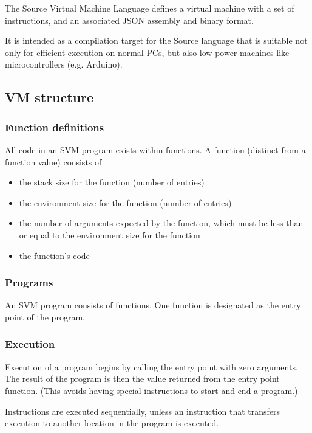 The Source Virtual Machine Language defines a virtual machine with a set of instructions,
and an associated JSON assembly and binary format.

It is intended as a compilation target for the Source language that is suitable
not only for efficient execution on normal PCs, but also low-power machines like
microcontrollers (e.g. Arduino).

\subsection{VM structure}

\subsubsection{Function definitions}

All code in an SVM program exists within functions. A function (distinct
from a function value) consists of

\begin{itemize}
\item
  the stack size for the function (number of entries)
\item
  the environment size for the function (number of entries)
\item
  the number of arguments expected by the function, which must be less
  than or equal to the environment size for the function
\item
  the function's code
\end{itemize}

\subsubsection{Programs}

An SVM program consists of functions. One function is designated as the
entry point of the program.

\subsubsection{Execution}

Execution of a program begins by calling the entry point with zero
arguments. The result of the program is then the value returned from the
entry point function. (This avoids having special instructions to start
and end a program.)

Instructions are executed sequentially, unless an instruction that
transfers execution to another location in the program is executed.

